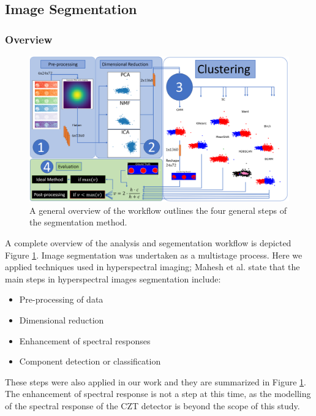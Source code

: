 \documentclass[a4paper,11pt]{article}
\begin{document}
\subsection{Image Segmentation}
\subsubsection{Overview}

\begin{figure}[htbp]

\includegraphics[width=\textwidth]{figures/flow_chart.png}

\caption{A general overview of the workflow outlines the four general steps of the segmentation method.}
\label{overview}
\end{figure}

\noindent A complete overview of the analysis and segementation workflow is depicted Figure \ref{overview}. Image segmentation was undertaken as a multistage process. Here we applied techniques used in hyperspectral imaging; Mahesh et al. \cite{Mahesh2015HyperspectralMaterials} state that the main steps in hyperspectral images segmentation include:
\begin{itemize}
\setlength\itemsep{0em}
\item Pre-processing of data 
\item Dimensional reduction
\item Enhancement of spectral responses
\item Component detection or classification 
\end{itemize}
These steps were also applied in our work and they are summarized in Figure \ref{overview}. The enhancement of spectral response is not a step at this time, as the modelling of the spectral response of the CZT detector is beyond the scope of this study.
\end{document}
